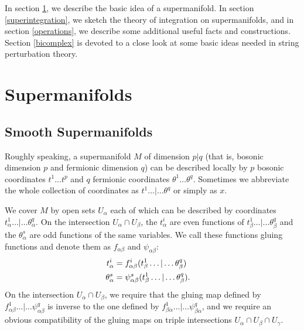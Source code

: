 \documentclass[11pt,a4paper]{article}
\begin{document}
In section \ref{supermanifolds}, we describe the basic idea of a supermanifold.  In section \ref{superintegration}, we sketch the theory of integration on supermanifolds, and 
in section \ref{operations}, we describe some additional useful facts and constructions.  Section \ref{bicomplex} is devoted
to a close look at some basic ideas needed in string perturbation theory.

\section{Supermanifolds}\label{supermanifolds}


\subsection{Smooth Supermanifolds}\label{smooth}

Roughly speaking, a supermanifold $M$ of dimension $p|q$ (that is, bosonic dimension $p$ and fermionic dimension $q$) can be described
locally by $p$ bosonic coordinates $t^1\dots t^p$ and $q$ fermionic coordinates $\theta^1\dots\theta^q$.  Sometimes we abbreviate the whole
collection of coordinates as $t^1\dots|\dots \theta^q$ or simply as $x$.  

We cover $M$ by open sets $U_\alpha$ each of which  can be described by coordinates $t^1_\alpha\dots |\dots \theta^q_\alpha$.
On the intersection $U_\alpha\cap U_\beta$, the $t^i_\alpha$ are even functions of $t^1_\beta\dots|\dots\theta^q_\beta$ and the $\theta^s_\alpha$
are odd functions of the same variables.  We call these functions gluing functions and denote them as $f_{\alpha\beta}$ and $\psi_{\alpha\beta}$:
\begin{align}\label{orro} t^i_\alpha & = f_{\alpha\beta}^i(t^1_\beta\dots|\dots \theta^q_\beta) \cr
                                                      \theta^s_\alpha& = \psi_{\alpha\beta}^s(t^1_\beta\dots|\dots\theta^q_\beta).\end{align}
On  the intersection $U_\alpha\cap U_\beta$, we require that the gluing map defined by $f_{\alpha\beta}^1\dots|\dots\psi^q_{\alpha\beta}$ is inverse to the 
one defined by $f_{\beta\alpha}^1\dots|\dots\psi_{\beta\alpha}^q$,
and we require an obvious compatibility of the gluing maps on triple intersections $U_\alpha\cap U_\beta\cap U_\gamma$.
\end{document}
